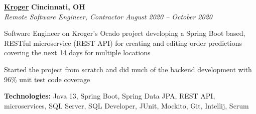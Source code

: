 %
    \headerrow
        {\textbf{\href{https://www.kroger.com/}{Kroger}}}
        {\textbf{Cincinnati, OH}}
    \\
    \headerrow
        {\emph{Remote Software Engineer, Contractor}}
        {\emph{August 2020 -- October 2020}}
    \begin{itemize*}
        \item Software Engineer on Kroger's Ocado project developing a Spring Boot based, RESTful microservice (REST API) for creating and editing
            order predictions covering the next 14 days for multiple locations
        \item Started the project from scratch and did much of the backend development with 96\% unit test code coverage
    \end{itemize*}

    \hspace{1.0em}
        {\textbf{Technologies:} Java 13, Spring Boot, Spring Data JPA, REST API, microservices, SQL Server, SQL Developer, JUnit, Mockito,
            Git, Intellij, Scrum}

